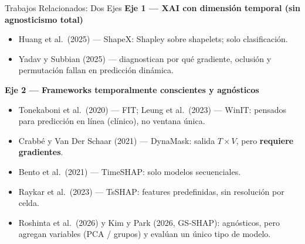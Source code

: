 \documentclass{beamer}
\begin{document}
\begin{frame}{Trabajos Relacionados: Dos Ejes}
    \textbf{Eje 1 — XAI con dimensión temporal (sin agnosticismo total)}
    \begin{itemize}
        \small
        \item Huang et al.\ (2025) — ShapeX: Shapley sobre shapelets;
        solo clasificación.
        \item Yadav y Subbian (2025) — diagnostican por qué gradiente,
        oclusión y permutación fallan en predicción dinámica.
    \end{itemize}
    \vspace{0.2cm}
    \textbf{Eje 2 — Frameworks temporalmente conscientes y agnósticos}
    \begin{itemize}
        \small
        \item Tonekaboni et al.\ (2020) — FIT; Leung et al.\ (2023) —
        WinIT: pensados para predicción en línea (clínico), no ventana
        única.
        \item Crabbé y Van Der Schaar (2021) — DynaMask: salida
        $T{\times}V$, pero \textbf{requiere gradientes}.
        \item Bento et al.\ (2021) — TimeSHAP: solo modelos secuenciales.
        \item Raykar et al.\ (2023) — TsSHAP: features predefinidas,
        sin resolución por celda.
        \item Roshinta et al.\ (2026) y Kim y Park (2026, GS-SHAP):
        agnósticos, pero agregan variables (PCA / grupos) y evalúan un
        único tipo de modelo.
    \end{itemize}
\end{frame}
\end{document}
